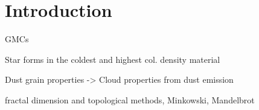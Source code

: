 \chapter{Introduction}

GMCs

Star forms in the coldest and highest col. density material

Dust grain properties -> Cloud properties from dust emission

fractal dimension and topological methods, Minkowski, Mandelbrot


